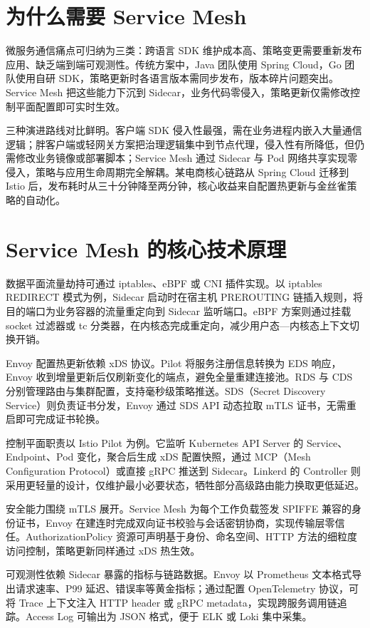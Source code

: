 \chapter{为什么需要 Service Mesh}
微服务通信痛点可归纳为三类：跨语言 SDK 维护成本高、策略变更需要重新发布应用、缺乏端到端可观测性。传统方案中，Java 团队使用 Spring Cloud，Go 团队使用自研 SDK，策略更新时各语言版本需同步发布，版本碎片问题突出。Service Mesh 把这些能力下沉到 Sidecar，业务代码零侵入，策略更新仅需修改控制平面配置即可实时生效。\par
三种演进路线对比鲜明。客户端 SDK 侵入性最强，需在业务进程内嵌入大量通信逻辑；胖客户端或轻网关方案把治理逻辑集中到节点代理，侵入性有所降低，但仍需修改业务镜像或部署脚本；Service Mesh 通过 Sidecar 与 Pod 网络共享实现零侵入，策略与应用生命周期完全解耦。某电商核心链路从 Spring Cloud 迁移到 Istio 后，发布耗时从三十分钟降至两分钟，核心收益来自配置热更新与金丝雀策略的自动化。\par
\chapter{Service Mesh 的核心技术原理}
数据平面流量劫持可通过 iptables、eBPF 或 CNI 插件实现。以 iptables REDIRECT 模式为例，Sidecar 启动时在宿主机 PREROUTING 链插入规则，将目的端口为业务容器的流量重定向到 Sidecar 监听端口。eBPF 方案则通过挂载 socket 过滤器或 tc 分类器，在内核态完成重定向，减少用户态—内核态上下文切换开销。\par
Envoy 配置热更新依赖 xDS 协议。Pilot 将服务注册信息转换为 EDS 响应，Envoy 收到增量更新后仅刷新变化的端点，避免全量重建连接池。RDS 与 CDS 分别管理路由与集群配置，支持毫秒级策略推送。SDS（Secret Discovery Service）则负责证书分发，Envoy 通过 SDS API 动态拉取 mTLS 证书，无需重启即可完成证书轮换。\par
控制平面职责以 Istio Pilot 为例。它监听 Kubernetes API Server 的 Service、Endpoint、Pod 变化，聚合后生成 xDS 配置快照，通过 MCP（Mesh Configuration Protocol）或直接 gRPC 推送到 Sidecar。Linkerd 的 Controller 则采用更轻量的设计，仅维护最小必要状态，牺牲部分高级路由能力换取更低延迟。\par
安全能力围绕 mTLS 展开。Service Mesh 为每个工作负载签发 SPIFFE 兼容的身份证书，Envoy 在建连时完成双向证书校验与会话密钥协商，实现传输层零信任。AuthorizationPolicy 资源可声明基于身份、命名空间、HTTP 方法的细粒度访问控制，策略更新同样通过 xDS 热生效。\par
可观测性依赖 Sidecar 暴露的指标与链路数据。Envoy 以 Prometheus 文本格式导出请求速率、P99 延迟、错误率等黄金指标；通过配置 OpenTelemetry 协议，可将 Trace 上下文注入 HTTP header 或 gRPC metadata，实现跨服务调用链追踪。Access Log 可输出为 JSON 格式，便于 ELK 或 Loki 集中采集。\par
